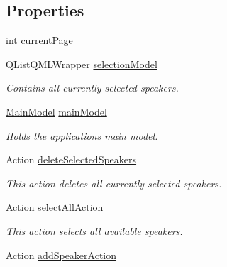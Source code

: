 \subsection*{Properties}
\begin{DoxyCompactItemize}
\item 
int \hyperlink{classmain_a4ede4960616afa3a86ec26a159598ee6}{current\-Page}
\item 
\hypertarget{classmain_a2ec401feae2b853e39598efac50ecd00}{Q\-List\-Q\-M\-L\-Wrapper \hyperlink{classmain_a2ec401feae2b853e39598efac50ecd00}{selection\-Model}}\label{classmain_a2ec401feae2b853e39598efac50ecd00}

\begin{DoxyCompactList}\small\item\em Contains all currently selected speakers. \end{DoxyCompactList}\item 
\hypertarget{classmain_a25ba853e098b739e9ca20ac90d147bcf}{\hyperlink{classMainModel}{Main\-Model} \hyperlink{classmain_a25ba853e098b739e9ca20ac90d147bcf}{main\-Model}}\label{classmain_a25ba853e098b739e9ca20ac90d147bcf}

\begin{DoxyCompactList}\small\item\em Holds the applications main model. \end{DoxyCompactList}\item 
\hypertarget{classmain_a9a47f6e2e719fff4105c5d13f1bd21d5}{Action \hyperlink{classmain_a9a47f6e2e719fff4105c5d13f1bd21d5}{delete\-Selected\-Speakers}}\label{classmain_a9a47f6e2e719fff4105c5d13f1bd21d5}

\begin{DoxyCompactList}\small\item\em This action deletes all currently selected speakers. \end{DoxyCompactList}\item 
\hypertarget{classmain_ad70cac7cdc3f18247724cdf9cc0825c7}{Action \hyperlink{classmain_ad70cac7cdc3f18247724cdf9cc0825c7}{select\-All\-Action}}\label{classmain_ad70cac7cdc3f18247724cdf9cc0825c7}

\begin{DoxyCompactList}\small\item\em This action selects all available speakers. \end{DoxyCompactList}\item 
\hypertarget{classmain_a7c45ba5e198fc637bc4dd7a7651ac8b9}{Action \hyperlink{classmain_a7c45ba5e198fc637bc4dd7a7651ac8b9}{add\-Speaker\-Action}}\label{classmain_a7c45ba5e198fc637bc4dd7a7651ac8b9}


\end{DoxyCompactItemize}
